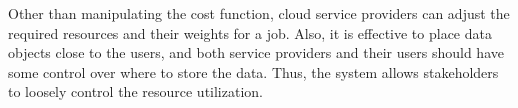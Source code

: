 
Other than manipulating the cost function,
cloud service providers can adjust the required resources and their
weights for a job.  Also, it is effective to place data objects close to the
users, and both service providers and their users should have some
control over where to store the data.
Thus, the system allows stakeholders to loosely control the
resource utilization.
